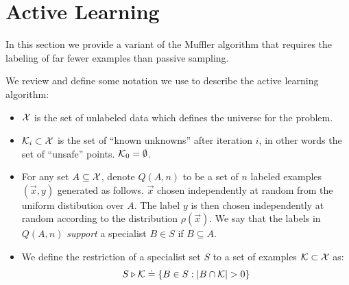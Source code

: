 \documentclass{article}
\newcommand{\X}{{\cal X}}
\newcommand{\x}{\vec{x}}
\newcommand{\K}{{\cal K}}
\newcommand{\restrictedto}{\triangleright}
\begin{document}
\iffalse
Our analysis consists of two parts:
\begin{itemize}
\item {\bf Sampling and convergence:} In this part we use large
  deviation bounds to compute a confidence interval for the bias of
  each ball. The length of the confidence interval is not uniform and
  is a function of the number of examples
  
\end{itemize}
\fi

\section{Active Learning}

In this section we provide a variant of the Muffler algorithm that
requires the labeling of far fewer examples than passive sampling.

We review and define some notation we use to describe the active learning algorithm: 

\begin{itemize}
\item $\X$ is the set of unlabeled data which defines the
  universe for the problem.
\item $\K_i \subset \X$ is the set of ``known unknowns'' after iteration $i$, in
  other words the set of ``unsafe'' points. $\K_0=\emptyset$.
\item For any set $A\subseteq \X$, denote $Q(A,n)$ to be a set of
  $n$ labeled examples $(\x,y)$ generated as follows. $\x$ chosen
  independently at random from the uniform distibution over
  $A$. The label $y$ is then chosen independently at random according
  to the distribution $\rho(\x)$. We say that the
  labels in $Q(A,n)$ {\em support} a specialist $B \in S$ if $B
  \subseteq A$.
\item We define the restriction of a specialist set $S$ to a set of
  examples $\K \subset \X$ as:
  $$
  S \restrictedto \K \doteq \left\{ B \in S : | B \cap \K | > 0 \right\}
  $$
\end{itemize}
\end{document}
